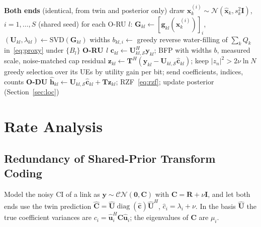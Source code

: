 \documentclass[journal]{IEEEtran}
\newcommand{\vect}[1]{\mathbf{#1}}
\DeclareMathOperator{\diag}{diag}
\begin{document}
\begin{algorithm}[t]
\caption{Shared-twin coding of SRS CI (one SRS occasion)}\label{alg:code}
\begin{algorithmic}[1]
\Statex \textbf{Both ends} (identical, from twin and posterior only)
  \State draw $\vect{x}_k^{(i)}\sim\mathcal{N}(\hat{\vect{x}}_k,s_k^2\vect{I})$, $i=1,\dots,S$ (shared seed)
  \State for each O-RU $l$: $\vect{G}_{kl}\gets[\vect{g}_{kl}(\vect{x}_k^{(i)})]_i$, $(\vect{U}_{kl},\lambda_{kl})\gets\mathrm{SVD}(\vect{G}_{kl})$
\EndFor
\State widths $b_{kl,i}\gets$ greedy reverse water-filling of $\sum_kQ_k$ in~\eqref{eq:proxy} under $\{B_l\}$
\Statex \textbf{O-RU $l$}
\State $\vect{c}_{kl}\gets\vect{U}_{kl,\mathcal{S}}^{H}\vect{y}_{kl}$; BFP with widths $b$, measured scale, noise-matched cap
\State residual $\vect{z}_{kl}\gets\vect{T}^{H}(\vect{y}_{kl}-\vect{U}_{kl,\mathcal{S}}\hat{\vect{c}}_{kl})$; keep $|z_n|^2>2\nu\ln N$
\State greedy selection over its UEs by utility gain per bit; send coefficients, indices, counts
\Statex \textbf{O-DU}
\State $\hat{\vect{h}}_{kl}\gets\vect{U}_{kl,\mathcal{S}}\hat{\vect{c}}_{kl}+\vect{T}\hat{\vect{z}}_{kl}$; RZF~\eqref{eq:rzf}; update posterior (Section~\ref{sec:loc})
\end{algorithmic}
\end{algorithm}

\section{Rate Analysis}\label{sec:rate}

\subsection{Redundancy of Shared-Prior Transform Coding}
Model the noisy CI of a link as $\vect{y}\sim\mathcal{CN}(\vect{0},\vect{C})$ with $\vect{C}=\vect{R}+\nu\vect{I}$, and let both ends use the twin prediction $\hat{\vect{C}}=\hat{\vect{U}}\diag(\hat{\vect{c}})\hat{\vect{U}}^{H}$, $\hat c_i=\lambda_i+\nu$. In the basis $\hat{\vect{U}}$ the true coefficient variances are $c_i=\hat{\vect{u}}_i^{H}\vect{C}\hat{\vect{u}}_i$; the eigenvalues of $\vect{C}$ are $\mu_i$.
\end{document}
